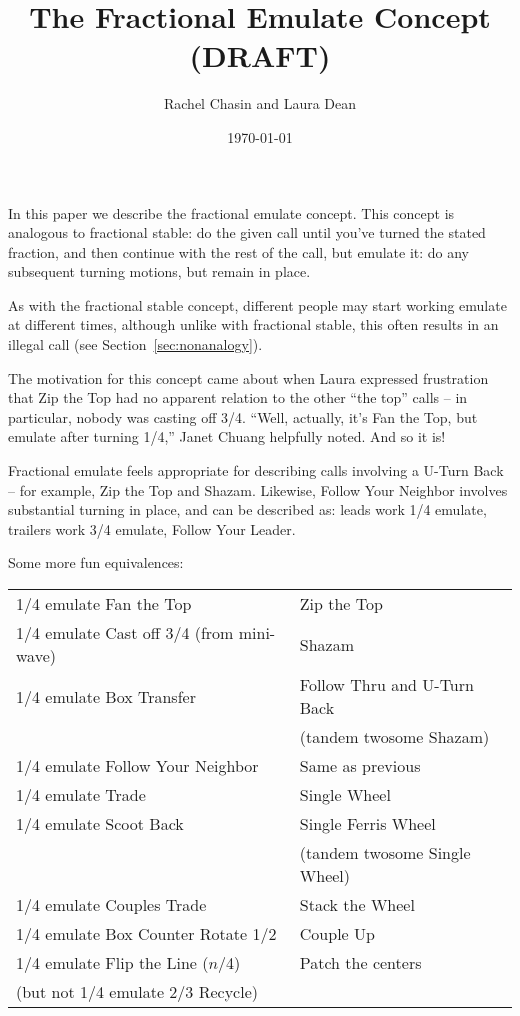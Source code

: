 \documentclass[11pt]{article}
\title{The Fractional Emulate Concept (DRAFT)}
\author{Rachel Chasin and Laura Dean}
\date{\today}
\begin{document}
\thispagestyle{empty}
\maketitle


In this paper we describe the fractional emulate concept. This concept
is analogous to fractional stable: do the given call until you've
turned the stated fraction, and then continue with the rest of the
call, but emulate it: do any subsequent turning motions,
but remain in place.

As with the fractional stable concept, different people may start
working emulate at different times, although unlike with fractional
stable, this often results in an illegal call (see
Section~\ref{sec:nonanalogy}).

The motivation for this concept came about when Laura expressed
frustration that Zip the Top had no apparent relation to the other
``the top'' calls -- in particular, nobody was casting off 3/4.
``Well, actually, it's Fan the Top, but emulate after turning 1/4,''
Janet Chuang helpfully noted.  And so it is!

Fractional emulate feels appropriate for describing calls
involving a U-Turn Back -- for example, Zip the Top and Shazam.
Likewise, Follow Your Neighbor involves substantial turning in place,
and can be described as: leads work 1/4 emulate,
trailers work 3/4 emulate, Follow Your Leader.

Some more fun equivalences:

\begin{tabular}{|l|l|}
\hline
1/4 emulate Fan the Top   & Zip the Top \\
1/4 emulate Cast off 3/4 (from mini-wave)  & Shazam \\
1/4 emulate Box Transfer & Follow Thru and U-Turn Back \\
& (tandem twosome Shazam) \\
1/4 emulate Follow Your Neighbor  & Same as previous\\
1/4 emulate Trade                          & Single Wheel \\
1/4 emulate Scoot Back  & Single Ferris Wheel \\
& (tandem twosome Single Wheel)\\
1/4 emulate Couples Trade  & Stack the Wheel \\
1/4 emulate Box Counter Rotate 1/2 & Couple Up \\
1/4 emulate Flip the Line ($n$/4) & Patch the centers \\
(but not 1/4 emulate 2/3 Recycle) & \\
\hline
\end{tabular}
\end{document}
